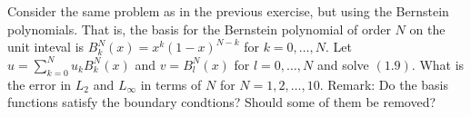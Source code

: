 \begin{exercise}
    Consider the same problem as in the previous exercise, but using the Bernstein polynomials.
    That is, the basis for the Bernstein polynomial of order $N$ on the unit inteval is $B_k^N(x) = x^k (1 - x)^{N - k}$ for $k = 0, \ldots, N$.
    Let $u = \sum_{k = 0}^N u_k B_k^N(x)$ and $v = B_l^N(x)$ for $l = 0, \ldots, N$ and solve $(1.9)$.
    What is the error in $L_2$ and $L_\infty$ in terms of $N$ for $N = 1, 2, \ldots, 10$.
    Remark: Do the basis functions satisfy the boundary condtions? Should some of them be removed?
\end{exercise}
